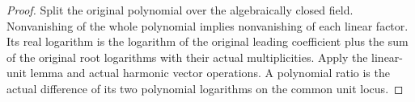 \begin{proof}
Split the original polynomial over the algebraically closed field.
Nonvanishing of the whole polynomial implies nonvanishing of each linear
factor. Its real logarithm is the logarithm of the original leading
coefficient plus the sum of the original root logarithms with their actual
multiplicities. Apply the linear-unit lemma and actual harmonic vector
operations. A polynomial ratio is the actual difference of its two
polynomial logarithms on the common unit locus.
\end{proof}

